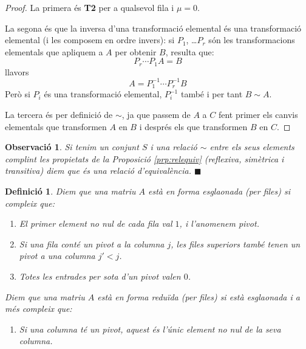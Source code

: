 \documentclass[
  11pt,
]{book}
\providecommand{\tightlist}{%
  \setlength{\itemsep}{0pt}\setlength{\parskip}{0pt}}
\numberwithin{dummy}{section}
\theoremstyle{maincolornumbox}
\newtheorem{remarkT}{Observació}[chapter]
\theoremstyle{blacknumex}
\theoremstyle{blacknumbox}
\newtheorem{definitionT}{Definició}[chapter]
\theoremstyle{maincolornum}
\newenvironment{definition}{\begin{dBox}\begin{definitionT}}{\end{definitionT}\end{dBox}}
\newenvironment{remark}{\begin{remarkT}}{\hfill{\tiny\ensuremath{\blacksquare}}\end{remarkT}}
\newlength\esp
\begin{document}
\begin{proof}
La primera és \textbf{T2} per a qualsevol fila i \(\mu=0\).

La segona és que la inversa d'una transformació elemental és una
transformació elemental (i les composem en ordre invers): si \(P_1\),
\ldots{}\(P_r\) són les transformacions elementals que apliquem a \(A\) per
obtenir \(B\), resulta que: \[P_r \cdots P_1 A=B\] llavors
\[A= P_1^{-1} \cdots P_r^{-1} B\] Però si \(P_i\) és una transformació
elemental, \(P_i^{-1}\) també i per tant \(B\sim A\).

La tercera és per definició de \(\sim\), ja que passem de \(A\) a \(C\) fent
primer els canvis elementals que transformen \(A\) en \(B\) i després els
que transformen \(B\) en \(C\).
\end{proof}

\begin{remark}
Si tenim un conjunt \(S\) i una relació \(\sim\) entre els seus elements
complint les propietats de la Proposició
\ref{prp:relequiv} (reflexiva, simètrica i transitiva) diem que
és una \emph{relació d'equivalència}.
\end{remark}

\begin{definition}

Diem que una matriu \(A\) està \emph{en forma esglaonada (per files)} si
compleix que:

\begin{enumerate}
\def\labelenumi{\arabic{enumi}.}
\item
  El primer element no nul de cada fila val \(1\), i l'anomenem \emph{pivot}.
\item
  Si una fila conté un pivot a la columna \(j\), les files superiors
  també tenen un pivot a una columna \(j'<j\).
\item
  Totes les entrades per sota d'un pivot valen \(0\).
\end{enumerate}

Diem que una matriu \(A\) està \emph{en forma reduïda (per files)} si està
esglaonada i a més compleix que:

\begin{enumerate}
\def\labelenumi{\arabic{enumi}.}
\tightlist
\item
  Si una columna té un pivot, aquest és l'únic element no nul de la
  seva columna.
\end{enumerate}

\end{definition}
\end{document}

